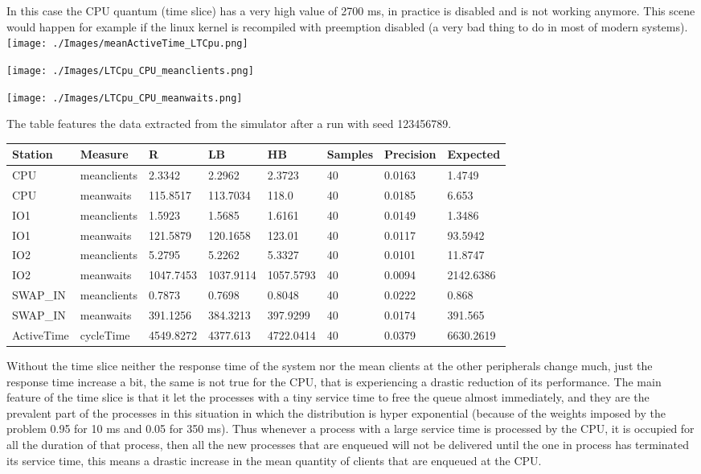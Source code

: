 \documentclass[12pt,a4paper]{article}
\begin{document}
In this case the CPU quantum (time slice) has a very high value of 2700 ms, in practice is disabled and is not working anymore. This scene would happen for example if the linux kernel is recompiled with preemption disabled (a very bad thing to do in most of modern systems).
\\

\texttt{[image: ./Images/meanActiveTime\_LTCpu.png]}


\texttt{[image: ./Images/LTCpu\_CPU\_meanclients.png]}


\texttt{[image: ./Images/LTCpu\_CPU\_meanwaits.png]}

The table features the data extracted from the simulator after a run with seed 123456789.


\begin{table}[!ht]
    \centering
    \begin{tabular}{|l|l|l|l|l|l|l|l|}
    \hline
    Station & Measure & R & LB & HB & Samples & Precision & Expected \\ \hline
    CPU & meanclients & 2.3342 & 2.2962 & 2.3723 & 40 & 0.0163 & 1.4749 \\ \hline
    CPU & meanwaits & 115.8517 & 113.7034 & 118.0 & 40 & 0.0185 & 6.653 \\ \hline
    IO1 & meanclients & 1.5923 & 1.5685 & 1.6161 & 40 & 0.0149 & 1.3486 \\ \hline
    IO1 & meanwaits & 121.5879 & 120.1658 & 123.01 & 40 & 0.0117 & 93.5942 \\ \hline
    IO2 & meanclients & 5.2795 & 5.2262 & 5.3327 & 40 & 0.0101 & 11.8747 \\ \hline
    IO2 & meanwaits & 1047.7453 & 1037.9114 & 1057.5793 & 40 & 0.0094 & 2142.6386 \\ \hline
    SWAP\_IN & meanclients & 0.7873 & 0.7698 & 0.8048 & 40 & 0.0222 & 0.868 \\ \hline
    SWAP\_IN & meanwaits & 391.1256 & 384.3213 & 397.9299 & 40 & 0.0174 & 391.565 \\ \hline
    ActiveTime & cycleTime & 4549.8272 & 4377.613 & 4722.0414 & 40 & 0.0379 & 6630.2619 \\ \hline
    \end{tabular}
\end{table}

Without the time slice neither the response time of the system nor the mean clients at the other peripherals change much, just the response time increase a bit, the same is not true for the CPU, that is experiencing a drastic reduction of its performance. The main feature of the time slice is that it let the processes with a tiny service time to free the queue almost immediately, and they are the prevalent part of the processes in this situation in which the distribution is hyper exponential (because of the weights imposed by the problem 0.95 for 10 ms and 0.05 for 350 ms). Thus whenever a process with a large service time is processed by the CPU, it is occupied for all the duration of that process, then all the new processes that are enqueued will not be delivered until the one in process has terminated its service time, this means a drastic increase in the mean quantity of clients that are enqueued at the CPU.
\end{document}
